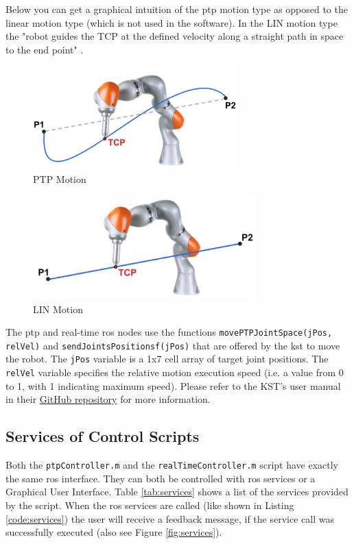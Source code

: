 \documentclass[headsepline,footinclude=false,fontsize=11pt,paper=a4,listof=totoc,bibliography=totoc,BCOR=12mm,DIV=14]{scrbook}
\begin{document}
Below you can get a graphical intuition of the \gls{ptp} motion type as opposed to the linear motion type (which is not used in the software). In the LIN motion type the "robot guides the TCP at the defined velocity along a straight path in space to the end point" \cite[p.~304]{KukaManual}. 

\begin{figure}[h]
    \centering
    \includegraphics[height=4cm]{images/ptp_motion}
    \caption{PTP Motion \cite[p.~304]{KukaManual}}
    \label{fig:ptp_motion}
\end{figure}
\begin{figure}[h]
    \centering
    \includegraphics[height=4cm]{images/lin_motion}
    \caption{LIN Motion \cite[p.~304]{KukaManual}}
    \label{fig:lin_motion}
\end{figure}

The \gls{ptp} and real-time \gls{ros} nodes use the functions \texttt{movePTPJointSpace(jPos, relVel)} and \texttt{sendJointsPositionsf(jPos)} that are offered by the \gls{kst} to move the robot. The \texttt{jPos} variable is a 1x7 cell array of target joint positions. The \texttt{relVel} variable specifies the relative motion execution speed (i.e. a value from 0 to 1, with 1 indicating maximum speed). Please refer to the KST's user manual in their \href{https://github.com/Modi1987/KST-Kuka-Sunrise-Toolbox}{GitHub repository} for more information.

\subsection{Services of Control Scripts}

Both the \texttt{ptpController.m} and the \texttt{realTimeController.m} script have exactly the same \gls{ros} interface. They can both be controlled with \gls{ros} services or a Graphical User Interface. Table \ref{tab:services} shows a list of the services provided by the script. When the \gls{ros} services are called (like shown in Listing \ref{code:services}) the user will receive a feedback message, if the service call was successfully executed (also see Figure \ref{fig:services}).
\end{document}
